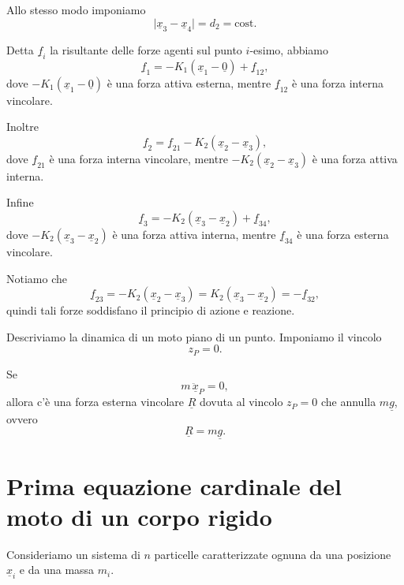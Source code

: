\begin{example}{}
Allo stesso modo imponiamo
\[
\lvert \underline{x}_3-\underline{x}_4\rvert=d_2=\text{cost}.
\]

Detta $\underline{f}_i$ la risultante delle forze agenti sul punto $i$-esimo, abbiamo
\[
\underline{f}_1=-K_1(\underline{x}_1-\underline{0})+\underline{f}_{12},
\]
dove $-K_1(\underline{x}_1-\underline{0})$ è una forza attiva esterna, mentre $\underline{f}_{12}$ è una forza interna vincolare.

Inoltre
\[
\underline{f}_2=\underline{f}_{21}-K_2(\underline{x}_2-\underline{x}_3),
\]
dove $\underline{f}_{21}$ è una forza interna vincolare, mentre $-K_2(\underline{x}_2-\underline{x}_3)$ è una forza attiva interna.

Infine
\[
\underline{f}_3=-K_2(\underline{x}_3-\underline{x}_2)+\underline{f}_{34},
\]
dove $-K_2(\underline{x}_3-\underline{x}_2)$ è una forza attiva interna, mentre $\underline{f}_{34}$ è una forza esterna vincolare.

Notiamo che
\[
\underline{f}_{23}=-K_2(\underline{x}_2-\underline{x}_3)
              =K_2(\underline{x}_3-\underline{x}_2)
              =-\underline{f}_{32},
\]
quindi tali forze soddisfano il principio di azione e reazione.
\end{example}

\begin{example}{}
Descriviamo la dinamica di un moto piano di un punto. Imponiamo il vincolo
\[
z_P=0.
\]

\begin{figure}
\centering
{}
\end{figure}

Se
\[
m\,\ddot{\underline{x}}_P=0,
\]
allora c'è una forza esterna vincolare $\underline{R}$ dovuta al vincolo $z_P=0$ che annulla $m\underline{g}$, ovvero
\[
\underline{R}=m\underline{g}.
\]
\end{example}

\section{Prima equazione cardinale del moto di un corpo rigido}
Consideriamo un sistema di $n$ particelle caratterizzate ognuna da una posizione $\underline{x}_i$ e da una massa $m_i$.

